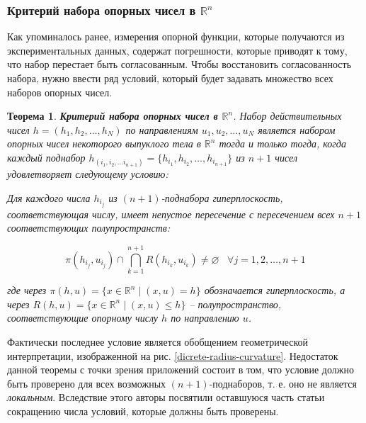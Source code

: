 \documentclass[a4paper, 12pt, titlepage]{article}
\theoremstyle{definition}
\theoremstyle{plain}
\newtheorem{SmartTheorem}{Теорема}
\theoremstyle{plain}
\begin{document}
\subsubsection{Критерий набора опорных чисел в $\mathbb{R}^{n}$}
\label{sec:history/KarlKVW96/support-vector-criterion}

Как упоминалось ранее, измерения опорной функции, которые получаются из
экспериментальных данных, содержат погрешности, которые приводят к тому, что
набор перестает быть согласованным. Чтобы восстановить согласованность набора,
нужно ввести ряд условий, который будет задавать множество всех наборов опорных
чисел.

\begin{SmartTheorem}
 \label{thm:discrete-consistency}
 \textbf{Критерий набора опорных чисел в $\mathbb{R}^{n}$}.
 Набор действительных чисел $h = (h_{1}, h_{2}, \ldots, h_{N})$ по
 направлениям $u_{1}, u_{2}, \ldots, u_{N}$ является набором  опорных чисел
 некоторого выпуклого тела в $\mathbb{R}^{n}$ тогда и только тогда, когда
 каждый поднабор $h_{(i_{1}, i_{2}, \ldots i_{n + 1})} = \{h_{i_{1}}, h_{i_{2}},
 \ldots, h_{i_{n + 1}}\}$ из $n + 1$ чисел удовлетворяет следующему условию:

 Для каждого числа $h_{i_{j}}$ из $(n + 1)$-поднабора гиперплоскость,
 соответствующая числу, имеет непустое пересечение с пересечением всех $n + 1$
 соответствующих полупространств:

 \begin{equation}
 \label{thm:discrete-consistency:condition}
  \pi(h_{i_{j}}, u_{i_{j}}) \cap \bigcap \limits_{k = 1}^{n + 1} R(h_{i_{k}}, 
  u_{i_{k}}) \neq \varnothing \;\;\; \forall j = 1, 2, \ldots, n + 1
 \end{equation}

 где через
 $\pi(h, u) = \{x \in \mathbb{R}^{n} \; | \; (x, u) = h\}$
 обозначается  гиперплоскость, а через
 $R(h, u) = \{x \in \mathbb{R}^{n} \; | \; (x, u) \leq h\}$
 -- полупространство, соответствующие опорному числу $h$ по направлению $u$.
\end{SmartTheorem}

Фактически последнее условие является обобщением геометрической интерпретации,
изображенной на рис. \ref{dicrete-radius-curvature}. Недостаток данной теоремы
с точки зрения приложений состоит в том, что условие должно быть проверено для
всех возможных $(n + 1)$-поднаборов, т. е. оно не является \textit{локальным}.
Вследствие этого авторы посвятили оставшуюся часть статьи сокращению числа
условий, которые должны быть проверены.
\end{document}
